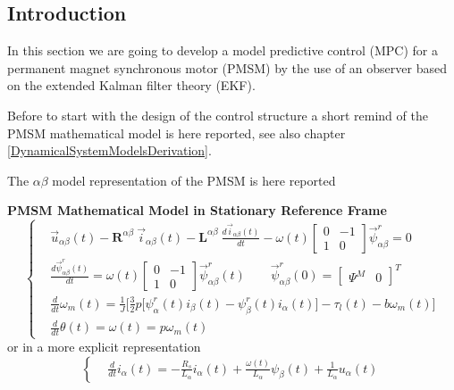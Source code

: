 \documentclass[12pt,a4paper,oneside]{book}
\begin{document}
\begin{onehalfspace}
\subsection{Introduction}
In this section we are going to develop a model predictive control (MPC) for a 
permanent magnet synchronous motor (PMSM) by the use of an observer based on 
the extended Kalman filter theory (EKF). 

Before to start with the design of the control structure a short remind of the PMSM mathematical model is here reported, see also chapter \ref{DynamicalSystemModelsDerivation}.

The $\alpha\beta$ model representation of the PMSM is here reported
\begin{mybox}
	\textbf{PMSM Mathematical Model in Stationary Reference Frame}
	\begin{equation}\label{pmsm_problem_1_eq_1}
		\left\lbrace \begin{aligned}
			& \vec{u}_{\alpha\beta}(t)-\mathbf{R}^{\alpha\beta}\ 
			\vec{i}_{\alpha\beta}(t)-\mathbf{L}^{\alpha\beta}\ 
			\frac{d\vec{i}_{\alpha\beta}(t)}{dt}-\omega(t) \begin{bmatrix} 
				0 & -1 \\ 1 & 0\end{bmatrix} \vec{\psi}^r_{\alpha\beta} = 0 
			\\[6pt]
			& \frac{d\vec{\psi}^r_{\alpha\beta}(t)}{dt} = \omega(t) 
			\begin{bmatrix} 0 & -1 \\ 1 & 0\end{bmatrix} 
			\vec{\psi}^r_{\alpha\beta}(t) \qquad 
			\vec{\psi}^r_{\alpha\beta}(0) = \begin{bmatrix} \Psi^M &  0 
			\end{bmatrix}^T \\[6pt]
			& \frac{d}{dt}{\omega}_m(t) = 
			\frac{1}{J}\Bigg[\frac{3}{2}p\Big[\psi^r_{\alpha}(t)i_{\beta}(t)-\psi^r_{\beta}(t)i_{\alpha}(t)\Big]
			-\tau_l(t) -b{\omega}_m(t)\Bigg]
			\\[6pt]
			& \frac{d}{dt}{\theta}(t) = \omega(t) = p\omega_m(t)
		\end{aligned} \right. 
	\end{equation}
	or in a more explicit representation
	\begin{equation}\label{pmsm_problem_1_eq_2}
		\left\lbrace \begin{aligned}
			& \frac{d}{dt} i_\alpha(t)= -\frac{R_s}{L_\alpha}i_\alpha(t) 
			+\frac{\omega(t)}{L_\alpha}\psi_\beta(t)+\frac{1}{L_\alpha}u_\alpha(t)

\end{aligned}
\end{equation}
\end{mybox}
\end{onehalfspace}
\end{document}
